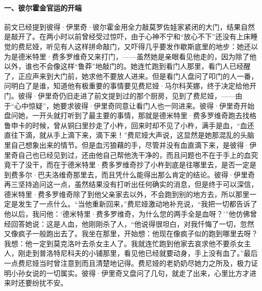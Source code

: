 \paragraph*{一、彼尔霍金官运的开端}
\par 前文已经提到彼得·伊里奇·彼尔霍金用全力敲莫罗佐娃家紧闭的大门，结果自然是敲开了。在两小时以前曾经受过惊吓，由于心神不宁和“放心不下”还没有上床睡觉的费尼娅，听见有人这样拼命敲门，又吓得几乎要发作歇斯底里的地步：她还以为是德米特里·费多罗维奇又来打门，——虽然她是亲眼看见他走的，因为除了他以外，谁也不会像这样“鲁莽”地敲门的。她连忙跑到看门人那里，看门人已经醒了，正应声来到大门前，她求他不要放人进来。但是看门人盘问了叩门的人一番，问明白了是谁，知道他有极重要的事情要见费尼娅·马尔科芙娜，终于决定给他开门。彼得·伊里奇仍旧走进了前文提到过的那个厨房，见到了费尼娅，——由于“心中惊疑”，她要求彼得·伊里奇同意让看门人也一同进来。彼得·伊里奇开始盘问她，一开头就打听到了最主要的事情，那就是德米特里·费多罗维奇跑去找格鲁申卡的时候，曾从铜臼里抄走了小杵，回来时却不见了小杵，满手是血，“血还直往下滴，就从手上滴下来，滴下来！”费尼娅大声说，这显然是她那混乱的头脑里自己想象出来的情节。但是血污狼藉的手，尽管并没有血直滴下来，是彼得·伊里奇自己也已经见到过，还由他自己帮他洗干净的，而且问题也不在于手上的血究竟干了没干，而在于德米特里·费多罗维奇抄了小杵到底是往哪里去，是否一定是到费多尔·巴夫洛维奇那里去，而且凭什么能得出那么肯定的结论。彼得·伊里奇再三坚持追问这一点，虽然结果没有打听出任何确实的消息，但是终于可以深信，德米特里·费多罗维奇除了到他父亲家去以外，不会跑到别的地方去，所以那里一定是发生了一点什么。“当他重新回来，”费尼娅激动地补充说，“我把一切都告诉了他以后，我问他：‘德米特里·费多罗维奇，为什么您的两手全是血呀？’”他仿佛曾经回答她说：这是人血，他刚刚杀了人，“他说得很坦白，对我忏悔了一切，忽然又像疯子一般跑出去了。我坐在那里，开始想：他现在像疯子似的跑到哪里去呀？我想：他一定到莫克洛叶去杀女主人了。我就连忙跑到他家去哀求他不要杀女主人，刚走到普洛特尼科夫的小铺那里，看见他已经就要动身，手上没有血了。”最后一点费尼娅当时曾注意到而且清楚地记得。费尼娅的老奶奶尽她力之所及，极力证明小孙女说的一切属实。彼得·伊里奇又盘问了几句，就走了出来，心里比方才进来时还要纷扰不安。

